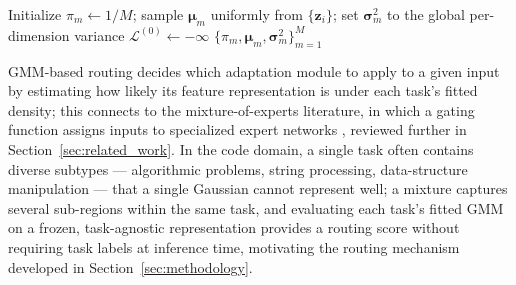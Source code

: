 \begin{algorithm}[t]
\caption{Expectation-Maximization for a Diagonal GMM}
\label{alg:em_gmm}
Initialize $\pi_m \leftarrow 1/M$; sample $\bm{\mu}_m$ uniformly from $\{\mathbf{z}_i\}$; set $\bm{\sigma}_m^2$ to the global per-dimension variance\;
$\mathcal{L}^{(0)} \leftarrow -\infty$\;
\Return $\{\pi_m, \bm{\mu}_m, \bm{\sigma}_m^2\}_{m=1}^M$\;
\end{algorithm}

GMM-based routing decides which adaptation module to apply to a given input by estimating how likely its feature representation is under each task's fitted density; this connects to the mixture-of-experts literature, in which a gating function assigns inputs to specialized expert networks \citep{jacobs1991adaptive,jordan1994hierarchical,shazeer2017outrageously,fedus2022switch}, reviewed further in Section~\ref{sec:related_work}. In the code domain, a single task often contains diverse subtypes --- algorithmic problems, string processing, data-structure manipulation --- that a single Gaussian cannot represent well; a mixture captures several sub-regions within the same task, and evaluating each task's fitted GMM on a frozen, task-agnostic representation provides a routing score without requiring task labels at inference time, motivating the routing mechanism developed in Section~\ref{sec:methodology}.
